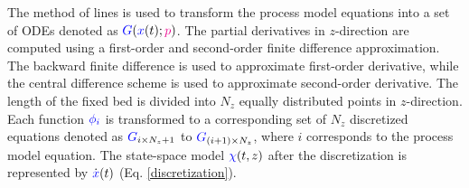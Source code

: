\documentclass[../Parameter_fitting.tex]{subfiles}
\begin{document}
			The method of lines is used to transform the process model equations into a set of ODEs denoted as ${\color{blue}G}({\color{blue}x}(t);{\color{magenta}p})$. The partial derivatives in $z$-direction are computed using a first-order and second-order finite difference approximation. The backward finite difference is used to approximate first-order derivative, while the central difference scheme is used to approximate second-order derivative. The length of the fixed bed is divided into $N_z$ equally distributed points in $z$-direction. Each function ${\color{blue}\phi_i}$ is transformed to a corresponding set of $N_z$ discretized equations denoted as ${\color{blue}G}_{i\times N_z+1}$ to ${\color{blue}G}_{(i+1)\times N_z}$, where $i$ corresponds to the process model equation. The state-space model ${\color{blue}\chi}(t,z)$ after the discretization is represented by $\dot{{\color{blue}x}}(t)$ (Eq.  \ref{discretization}).
			
\end{document}
